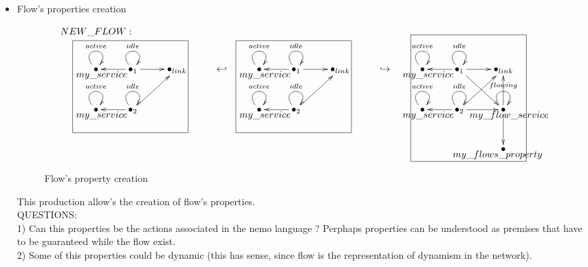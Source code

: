 \documentclass[envcountsect,runningheads]{llncs}
\begin{document}
\begin{itemize}
  \item Flow's properties creation
  \begin{figure}[H]
    \[
       \xymatrix@C=25pt@R=30pt
       {
         {}\POS[]-<0pc,0pc>\drop{NEW\_FLOW:}
         \\
         {\bullet}\ar@(ul,ur)^{active} \POS[]-<-.5pc,.5pc> \drop{my\_service} &
         {\bullet}_{1}\ar@(ul,ur)^{idle}\ar@{->}[l]\ar@{->}[r] &
         {\bullet}_{link}
         & {\hookleftarrow} & 
         {\bullet}\ar@(ul,ur)^{active} \POS[]-<-.5pc,.5pc> \drop{my\_service} &
         {\bullet}_{1}\ar@(ul,ur)^{idle}\ar@{->}[l]\ar@{->}[r] &
         {\bullet}_{link} 
         & {\hookrightarrow} & 
         {\bullet}\ar@(ul,ur)^{active} \POS[]-<-.5pc,.5pc> \drop{my\_service} &
         {\bullet}_{1}\ar@(ul,ur)^{idle}\ar@{->}[l]\ar@{->}[r]\ar@{->}[dr] &
         {\bullet}_{link}
         \\
         {\bullet}\ar@(ul,ur)^{active}\POS[]-<-.5pc,.5pc> \drop{my\_service} \POS[]+<3pc,2pc>*+=<10pc,8pc>[F-]{} &
         {\bullet}_{2}\ar@(ul,ur)^{idle}\ar@{->}[l]\ar@{->}[ur]
         & & &
         {\bullet}\ar@(ul,ur)^{active}\POS[]-<-.5pc,.5pc> \drop{my\_service} \POS[]+<3pc,2pc>*+=<10pc,8pc>[F-]{} &
         {\bullet}_{2}\ar@(ul,ur)^{idle}\ar@{->}[l]\ar@{->}[ur]
         & & &
        {\bullet}\ar@(ul,ur)^{active}\POS[]-<-.5pc,.5pc> \drop{my\_service} \POS[]+<3pc,2pc>*+=<10pc,8pc>[]{} &
         {\bullet}_{2}\ar@(ul,ur)^{idle}\ar@{->}[l]\ar@{->}[ur]\ar@{->}[r] &
         {\bullet}\ar@(ul,ur)^{flowing}\ar@{->}[u]\ar@{->}[d] \POS[]+<-3pc,1pc>*+=<10pc,11pc>[F-]{} 
         \POS[]-<-.5pc,.5pc>\drop{my\_flow\_service}
         \\\
         & & & & & & & & & &{\bullet}\POS[]-<.5pc,.5pc> \drop{my\_flows\_property}
      }
    \]
    \caption{Flow's property creation}
    \protect\label{fig:flowpropertycreation}
  \end{figure}
  This production allow's the creation of flow's properties.\\
  
  QUESTIONS:\\
  1) Can this properties be the actions associated in the nemo language ? 
  Perphaps properties can be understood as premises that have to be guaranteed 
  while the flow exist. \\
  2) Some of this properties could be dynamic (this has sense, since flow is the representation 
  of dynamism in the network). \\
    
\end{itemize} 
\end{document}
